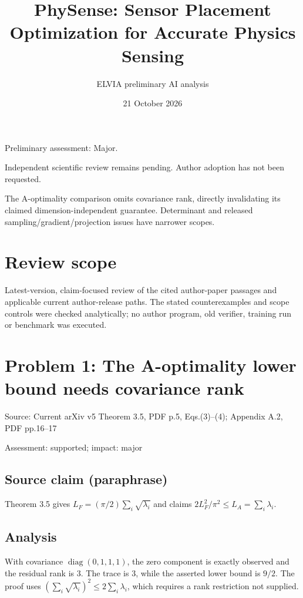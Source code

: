 \documentclass[11pt]{article}
\begin{document}
\title{PhySense: Sensor Placement Optimization for Accurate Physics Sensing}

\author{ELVIA preliminary AI analysis}\date{21 October 2026}\maketitle

Preliminary assessment: Major.\par

Independent scientific review remains pending. Author adoption has not been requested.

The A-optimality comparison omits covariance rank, directly invalidating its claimed dimension-independent guarantee. Determinant and released sampling/gradient/projection issues have narrower scopes.

\section*{Review scope}

Latest-version, claim-focused review of the cited author-paper passages and applicable current author-release paths. The stated counterexamples and scope controls were checked analytically; no author program, old verifier, training run or benchmark was executed.

\section*{Problem 1: The A-optimality lower bound needs covariance rank}

Source: Current arXiv v5 Theorem 3.5, PDF p.5, Eqs.(3)–(4); Appendix A.2, PDF pp.16–17

Assessment: supported; impact: major

\subsection*{Source claim (paraphrase)}

Theorem 3.5 gives \(L_F=(\pi/2)\sum_i\sqrt{\lambda_i}\) and claims \(2L_F^2/\pi^2\leq L_A=\sum_i\lambda_i\).

\subsection*{Analysis}

With covariance \(\operatorname{diag}(0,1,1,1)\), the zero component is exactly observed and the residual rank is \(3\). The trace is \(3\), while the asserted lower bound is \(9/2\). The proof uses \((\sum_i\sqrt{\lambda_i})^2\leq2\sum_i\lambda_i\), which requires a rank restriction not supplied.
\end{document}
